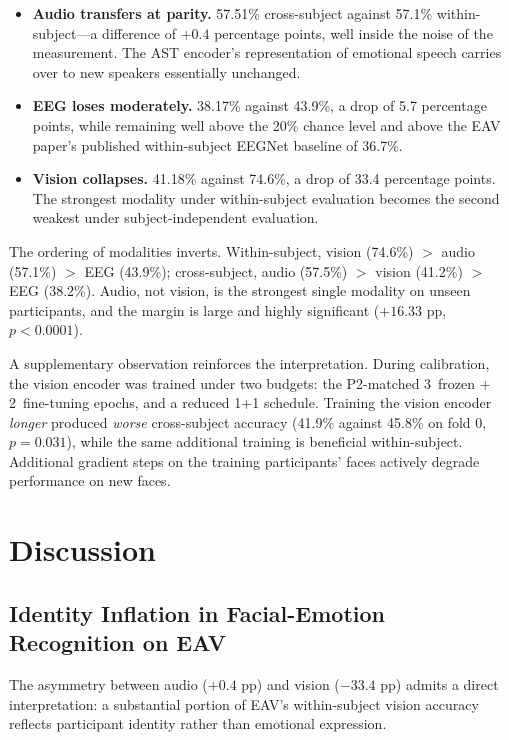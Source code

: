 \begin{itemize}
    \item \textbf{Audio transfers at parity.} 57.51\% cross-subject against 57.1\%
    within-subject---a difference of $+0.4$ percentage points, well inside the noise
    of the measurement. The AST encoder's representation of emotional speech carries
    over to new speakers essentially unchanged.
    \item \textbf{EEG loses moderately.} 38.17\% against 43.9\%, a drop of 5.7
    percentage points, while remaining well above the 20\% chance level and above the
    EAV paper's published within-subject EEGNet baseline of 36.7\%.
    \item \textbf{Vision collapses.} 41.18\% against 74.6\%, a drop of 33.4
    percentage points. The strongest modality under within-subject evaluation becomes
    the second weakest under subject-independent evaluation.
\end{itemize}

The ordering of modalities inverts. Within-subject, vision (74.6\%) $>$ audio (57.1\%)
$>$ EEG (43.9\%); cross-subject, audio (57.5\%) $>$ vision (41.2\%) $>$ EEG (38.2\%).
Audio, not vision, is the strongest single modality on unseen participants, and the
margin is large and highly significant ($+16.33$ pp, $p < 0.0001$).

A supplementary observation reinforces the interpretation. During calibration, the
vision encoder was trained under two budgets: the P2-matched 3~frozen $+$
2~fine-tuning epochs, and a reduced 1$+$1 schedule. Training the vision encoder
\emph{longer} produced \emph{worse} cross-subject accuracy (41.9\% against 45.8\% on
fold 0, $p = 0.031$), while the same additional training is beneficial within-subject.
Additional gradient steps on the training participants' faces actively degrade
performance on new faces.

\section{Discussion}
\label{sec:cs_discussion}

\subsection{Identity Inflation in Facial-Emotion Recognition on EAV}

The asymmetry between audio ($+0.4$ pp) and vision ($-33.4$ pp) admits a direct
interpretation: a substantial portion of EAV's within-subject vision accuracy
reflects participant identity rather than emotional expression.

